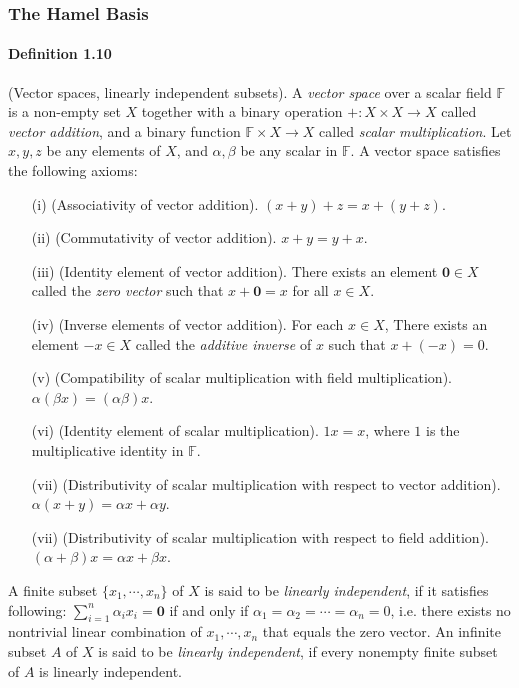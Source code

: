 \documentclass{article}
\begin{document}
\subsubsection{The Hamel Basis}
\paragraph{Definition 1.10\label{def:1.10}} (Vector spaces, linearly independent subsets). A \textit{vector space} over a scalar field $\mathbb{F}$ is a non-empty set $X$ together with a binary operation $+:X\times X\to X$ called \textit{vector addition}, and a binary function $\mathbb{F}\times X\to X$ called \textit{scalar multiplication}. Let $x,y,z$ be any elements of $X$, and $\alpha,\beta$ be any scalar in $\mathbb{F}$. A vector space satisfies the following axioms:
\begin{itemize}
	\item[(i)] (Associativity of vector addition). $(x+y)+z=x+(y+z)$.
	\item[(ii)] (Commutativity of vector addition). $x+y=y+x$.
	\item[(iii)] (Identity element of vector addition). There exists an  element $\mathbf{0}\in X$ called the \textit{zero vector} such that $x+\mathbf{0}=x$ for all $x\in X$.
	\item [(iv)] (Inverse elements of vector addition). For each $x\in X$, There exists an element $-x\in X$ called the \textit{additive inverse} of $x$ such that $x+(-x)=0$.
	\item[(v)] (Compatibility of scalar multiplication with field multiplication). $\alpha(\beta x)=(\alpha\beta)x$.
	\item[(vi)] (Identity element of scalar multiplication). $1x=x$, where $1$ is the multiplicative identity in $\mathbb{F}$. 
	\item[(vii)] (Distributivity of scalar multiplication with respect to vector addition). $\alpha(x+y) = \alpha x + \alpha y$.
	\item[(vii)] (Distributivity of scalar multiplication with respect to field addition). $(\alpha + \beta)x = \alpha x + \beta x$.
\end{itemize}

A finite subset $\{x_1,\cdots,x_n\}$ of $X$ is said to be \textit{linearly independent}, if it satisfies following: $\sum_{i=1}^n \alpha_i x_i=\mathbf{0}$ if and only if $\alpha_1=\alpha_2=\cdots=\alpha_n= 0$, i.e. there exists no nontrivial linear combination of $x_1,\cdots,x_n$ that equals the zero vector. An infinite subset $A$ of $X$ is said to be \textit{linearly independent}, if every nonempty finite subset of $A$ is linearly independent.
\end{document}
